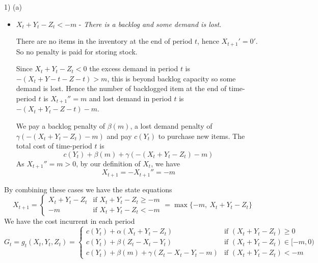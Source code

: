 \documentclass[11pt,a4paper]{article}
\begin{document}
\begin{answer}{1) (a)}
\begin{itemize}
\begin{itemize}
      \item $X_t+Y_t-Z_t<-m$ -\textit{ There is a backlog and some demand is lost}.
      \par There are no items in the inventory at the end of period $t$, hence $X_{t+1}'=0'$. So no penalty is paid for storing stock.
      \par Since $X_t+Y_t-Z_t<0$ the excess demand in period $t$ is $-(X_t+Y-t-Z-t)>m$, this is beyond backlog capacity so some demand is lost. Hence the number of backlogged item at the end of time-period $t$ is $X_{t+1}''=m$ and lost demand in period $t$ is $-(X_t+Y_t-Z-t)-m$.
      \par We pay a backlog penalty of $\beta(m)$, a lost demand penalty of $\gamma(-(X_t+Y_t-Z_t)-m)$ and pay $c(Y_t)$ to purchase new items. The total cost of time-period $t$ is
      \[ c(Y_t)+\beta(m)+\gamma(-(X_t+Y_t-Z_t)-m) \]
      As $X_{t+1}''=m>0$, by our definition of $X_t$, we have
      \[ X_{t+1}=-X_{t+1}''=-m \]
    \end{itemize}
    By combining these cases we have the state equations
    \[ X_{t+1}=\begin{cases}X_t+Y_t-Z_t&\text{if }X_t+Y_t-Z_t\geq-m\\-m&\text{if }X_t+Y_t-Z_t<-m\end{cases}=\max\{-m,\ X_t+Y_t-Z_t\} \]
    We have the cost incurrent in each period
    \[ G_t=g_t(X_t,Y_t,Z_t)=\begin{cases}
      c(Y_t)+\alpha(X_t+Y_t-Z_t)&\text{if }(X_t+Y_t-Z_t)\geq0\\
      c(Y_t)+\beta(Z_t-X_t-Y_t)&\text{if }(X_t+Y_t-Z_t)\in[-m,0)\\
      c(Y_t)+\beta(m)+\gamma(Z_t-X_t-Y_t-m)&\text{if }(X_t+Y_t-Z_t)<-m
    \end{cases} \]


\end{itemize}
\end{answer}
\end{document}
